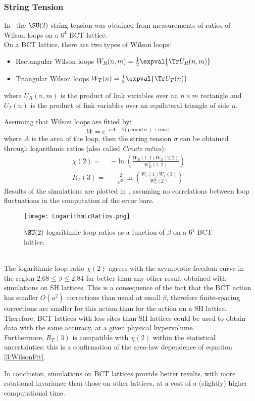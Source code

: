 \subsubsection{String Tension}
In~\cite{Celmaster:1983hs} the $\SU(2)$ string tension was obtained from measurements of ratios of Wilson loops on a $6^4$ BCT lattice.\\
On a BCT lattice, there are two types of Wilson loops:
\begin{itemize}
    \item Rectangular Wilson loops $W_R(n,m)=\frac12\expval{\Tr U_R(n,m)}$\
    \item Triangular Wilson loops $W_T(n)=\frac12\expval{\Tr U_T(n)}$
\end{itemize}
where $U_R(n,m)$ is the product of link variables over an $n\times m$ rectangle and $U_T(n)$ is the product of link variables over an equilateral triangle of side $n$.

Assuming that Wilson loops are fitted by:
\begin{equation}
    W = e^{-\sigma A -b(\text{perimeter}) +\text{const.}} \label{3:WilsonFit}
\end{equation}
where $A$ is the area of the loop, then the string tension $\sigma$ can be obtained through logarithmic ratios (also called \emph{Creutz ratios}):
\begin{align}
    \chi(2) =& -\ln(\frac{W_R(1,1)W_R(2,2)}{W_R^2(1,2)}) \\
    R_T(3) =& -\frac{2}{\sqrt3}\ln(\frac{W_T(1)W_T(3)}{W_T^2(2)})
\end{align}
Results of the simulations are plotted in , assuming no correlations between loop fluctuations in the computation of the error bars.
\begin{figure}[!htbp]
    \centering
    \texttt{[image: LogarithmicRatios.png]}
    \caption{$\SU(2)$ logarithmic loop ratios as a function of $\beta$ on a $6^4$ BCT lattice.}
    \label{3F:LogLoopRatios}
\end{figure}\\
The logarithmic loop ratio $\chi(2)$ agrees with the asymptotic freedom curve in the region $2.68\leq\beta\leq2.84$ far better than any other result obtained with simulations on SH lattices.
This is a consequence of the fact that the BCT action has smaller $O(a^2)$ corrections than usual at small $\beta$, therefore finite-spacing corrections are smaller for this action than for the action on a SH lattice.
Therefore, BCT lattices with less sites than SH lattices could be used to obtain data with the same accuracy, at a given physical hypervolume.\\
Furthermore, $R_T(3)$ is compatible with $\chi(2)$ within the statistical uncertainties: this is a confirmation of the area-law dependence of equation \eqref{3:WilsonFit}.

In conclusion, simulations on BCT lattices provide better results, with more rotational invariance than those on other lattices, at a cost of a (slightly) higher computational time.
